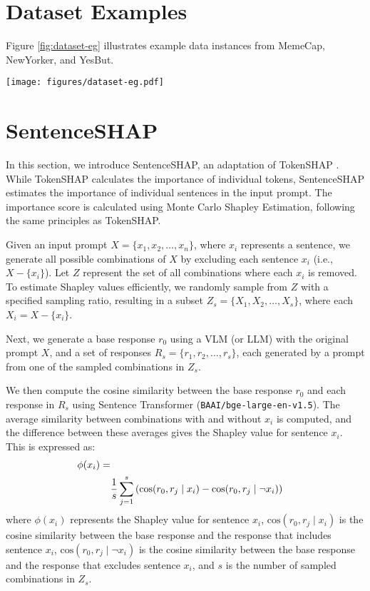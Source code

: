 \section{Dataset Examples}
\label{app:dataset-eg}
Figure \ref{fig:dataset-eg} illustrates example data instances from MemeCap, NewYorker, and YesBut.

\begin{figure*}[t]
  \texttt{[image: figures/dataset-eg.pdf]} \hfill
  \caption {Dataset Examples on MemeCap, NewYorker, and YesBut.}
  \label{fig:dataset-eg}
\end{figure*}


\section{SentenceSHAP}
\label{app:sentence-shap}
In this section, we introduce SentenceSHAP, an adaptation of TokenSHAP \cite{horovicz-goldshmidt-2024-tokenshap}. While TokenSHAP calculates the importance of individual tokens, SentenceSHAP estimates the importance of individual sentences in the input prompt. The importance score is calculated using Monte Carlo Shapley Estimation, following the same principles as TokenSHAP.

Given an input prompt \( X = \{x_1, x_2, \dots, x_n\} \), where \( x_i \) represents a sentence, we generate all possible combinations of \( X \) by excluding each sentence \( x_i \) (i.e., \( X - \{x_i\} \)). Let \( Z \) represent the set of all combinations where each \( x_i \) is removed. To estimate Shapley values efficiently, we randomly sample from \( Z \) with a specified sampling ratio, resulting in a subset \( Z_s = \{X_1, X_2, \dots, X_s\} \), where each \( X_i = X - \{x_i\} \).

Next, we generate a base response \( r_0 \) using a VLM (or LLM) with the original prompt \( X \), and a set of responses \( R_s = \{r_1, r_2, \dots, r_s\} \), each generated by a prompt from one of the sampled combinations in \( Z_s \).

We then compute the cosine similarity between the base response \( r_0 \) and each response in \( R_s \) using Sentence Transformer (\texttt{BAAI/bge-large-en-v1.5}). The average similarity between combinations with and without \( x_i \) is computed, and the difference between these averages gives the Shapley value for sentence \( x_i \). This is expressed as:
\begin{align}
\notag
\phi(x_i) = \\ \notag
&\frac{1}{s} \sum_{j=1}^{s} \left( \text{cos}(r_0, r_j \mid x_i) - \text{cos}(r_0, r_j \mid \neg x_i) \right)
\end{align}
where \( \phi(x_i) \) represents the Shapley value for sentence \( x_i \), $\text{cos}(r_0, r_j \mid x_i)$ is the cosine similarity between the base response and the response that includes sentence $x_i$, $\text{cos}(r_0, r_j \mid \neg x_i)$ is the cosine similarity between the base response and the response that excludes sentence $x_i$, and $s$ is the number of sampled combinations in $Z_s$.

